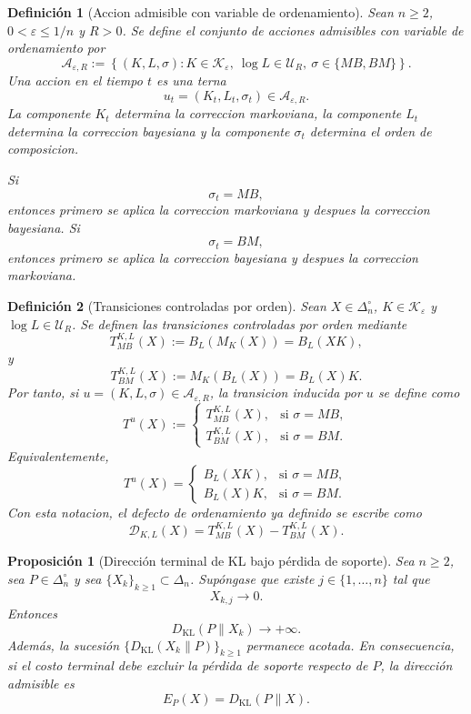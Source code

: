 ﻿\documentclass[12pt]{article}
\newtheorem{definicion}{Definición}[section]
\newtheorem{proposicion}{Proposición}[section]
\begin{document}
\begin{definicion}[Accion admisible con variable de ordenamiento]\label{def:accion_admisible_ordenamiento}
Sean \(n\ge 2\), \(0<\varepsilon\le 1/n\) y \(R>0\). Se define el conjunto de acciones admisibles con variable de ordenamiento por
\[
\mathcal A_{\varepsilon,R}
:=
\left\{
(K,L,\sigma):
K\in\mathcal K_\varepsilon,\ 
\log L\in\mathcal U_R,\ 
\sigma\in\{MB,BM\}
\right\}.
\]
Una accion en el tiempo \(t\) es una terna
\[
u_t=(K_t,L_t,\sigma_t)\in\mathcal A_{\varepsilon,R}.
\]
La componente \(K_t\) determina la correccion markoviana, la componente \(L_t\) determina la correccion bayesiana y la componente \(\sigma_t\) determina el orden de composicion.

Si
\[
\sigma_t=MB,
\]
entonces primero se aplica la correccion markoviana y despues la correccion bayesiana. Si
\[
\sigma_t=BM,
\]
entonces primero se aplica la correccion bayesiana y despues la correccion markoviana.
\end{definicion}

\begin{definicion}[Transiciones controladas por orden]\label{def:transiciones_controladas_orden}
Sean \(X\in\Delta_n^\circ\), \(K\in\mathcal K_\varepsilon\) y \(\log L\in\mathcal U_R\). Se definen las transiciones controladas por orden mediante
\[
T_{MB}^{K,L}(X)
:=
B_L(M_K(X))
=
B_L(XK),
\]
y
\[
T_{BM}^{K,L}(X)
:=
M_K(B_L(X))
=
B_L(X)K.
\]
Por tanto, si \(u=(K,L,\sigma)\in\mathcal A_{\varepsilon,R}\), la transicion inducida por \(u\) se define como
\[
T^u(X)
:=
\begin{cases}
T_{MB}^{K,L}(X), & \text{si } \sigma=MB,\\[2mm]
T_{BM}^{K,L}(X), & \text{si } \sigma=BM.
\end{cases}
\]
Equivalentemente,
\[
T^u(X)
=
\begin{cases}
B_L(XK), & \text{si } \sigma=MB,\\[2mm]
B_L(X)K, & \text{si } \sigma=BM.
\end{cases}
\]
Con esta notacion, el defecto de ordenamiento ya definido se escribe como
\[
\mathcal D_{K,L}(X)
=
T_{MB}^{K,L}(X)-T_{BM}^{K,L}(X).
\]
\end{definicion}

\begin{proposicion}[Dirección terminal de KL bajo pérdida de soporte]
\label{prop:direccion_terminal_KL}
Sea \(n\ge 2\), sea \(P\in\Delta_n^\circ\) y sea \(\{X_k\}_{k\ge1}\subset\Delta_n\). Supóngase que existe \(j\in\{1,\ldots,n\}\) tal que
\[
X_{k,j}\longrightarrow 0.
\]
Entonces
\[
D_{\mathrm{KL}}(P\|X_k)\longrightarrow +\infty.
\]
Además, la sucesión \(\{D_{\mathrm{KL}}(X_k\|P)\}_{k\ge1}\) permanece acotada. En consecuencia, si el costo terminal debe excluir la pérdida de soporte respecto de \(P\), la dirección admisible es
\[
E_P(X)=D_{\mathrm{KL}}(P\|X).
\]
\end{proposicion}
\end{document}
